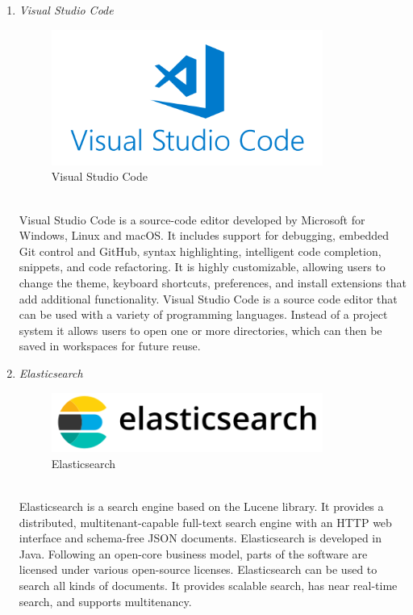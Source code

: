 \documentclass[conference]{IEEEtran}
\begin{document}
\begin{enumerate}
      \item \textit{Visual Studio Code }
                      \begin{figure}[htbp]
    \centerline{\includegraphics[width=89mm, scale=0.5]{fig/vscode.png}}
    \caption{Visual Studio Code}
    \label{fig}
    \end{figure}
   \\Visual Studio Code is a source-code editor developed by Microsoft for Windows, Linux and macOS. It includes support for debugging, embedded Git control and GitHub, syntax highlighting, intelligent code completion, snippets, and code refactoring. It is highly customizable, allowing users to change the theme, keyboard shortcuts, preferences, and install extensions that add additional functionality. Visual Studio Code is a source code editor that can be used with a variety of programming languages. Instead of a project system it allows users to open one or more directories, which can then be saved in workspaces for future reuse.\\
      \item \textit{Elasticsearch }
                      \begin{figure}[htbp]
    \centerline{\includegraphics[width=89mm, scale=0.5]{fig/elasticsearch.png}}
    \caption{Elasticsearch}
    \label{fig}
    \end{figure}
   \\Elasticsearch is a search engine based on the Lucene library. It provides a distributed, multitenant-capable full-text search engine with an HTTP web interface and schema-free JSON documents. Elasticsearch is developed in Java. Following an open-core business model, parts of the software are licensed under various open-source licenses. Elasticsearch can be used to search all kinds of documents. It provides scalable search, has near real-time search, and supports multitenancy.\\
 
\end{enumerate}
\end{document}
